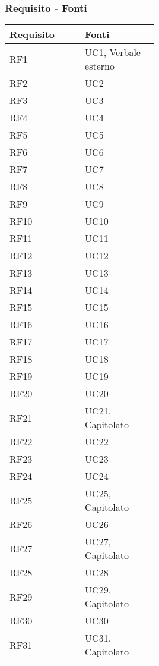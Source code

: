 \subsubsection{Requisito - Fonti}
\begin{center}
	\begin{tabular}{ |p{0.25\linewidth}|p{0.25\linewidth}| } 
		\hline
		\textbf{Requisito} & \textbf{Fonti} \\
		\hline
		RF1 & UC1, Verbale esterno \\
		\hline
		RF2 & UC2 \\
		\hline
		RF3 & UC3 \\
		\hline
		RF4 & UC4 \\
		\hline
		RF5 & UC5 \\
		\hline
		RF6 & UC6 \\
		\hline
		RF7 & UC7 \\
		\hline
		RF8 & UC8 \\
		\hline
		RF9 & UC9 \\
		\hline
		RF10 & UC10 \\
		\hline
		RF11 & UC11 \\
		\hline
		RF12 & UC12 \\
		\hline
		RF13 & UC13 \\
		\hline
		RF14 & UC14 \\
		\hline
		RF15 & UC15 \\
		\hline
		RF16 & UC16 \\
		\hline
		RF17 & UC17 \\
		\hline
		RF18 & UC18 \\
		\hline
		RF19 & UC19 \\
		\hline
		RF20 & UC20 \\
		\hline
		RF21 & UC21, Capitolato \\
		\hline
		RF22 & UC22 \\
		\hline
		RF23 & UC23 \\
		\hline
		RF24 & UC24 \\
		\hline
		RF25 & UC25, Capitolato \\
		\hline
		RF26 & UC26 \\
		\hline
		RF27 & UC27, Capitolato \\
		\hline
		RF28 & UC28 \\
		\hline
		RF29 & UC29, Capitolato \\
		\hline
		RF30 & UC30 \\
		\hline
		RF31 & UC31, Capitolato \\

\end{tabular}
\end{center}
